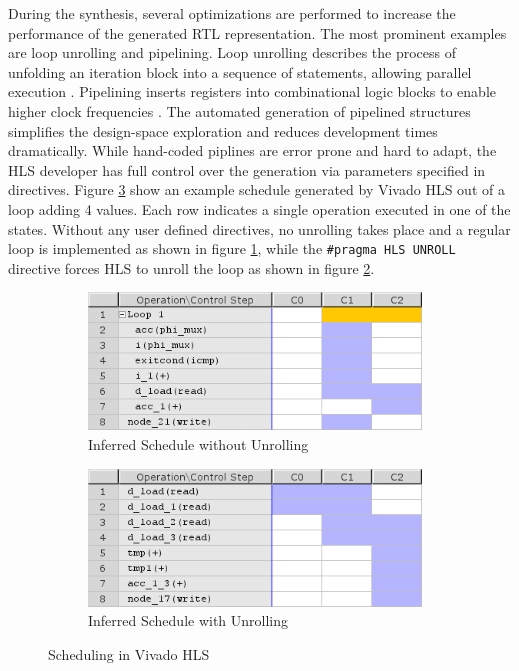 During the synthesis, several optimizations are performed to increase the
performance of the generated \ac{RTL} representation. The most prominent
examples are loop unrolling and pipelining. Loop unrolling describes the
process of unfolding an iteration block into a sequence of statements,
allowing parallel execution \citep{SWL13}. Pipelining inserts registers into
combinational logic blocks to enable higher clock frequencies \citep{SWL13}.
The automated generation of pipelined structures simplifies the design-space
exploration and reduces development times dramatically. While hand-coded
piplines are error prone and hard to adapt, the \ac{HLS} developer has full
control over the generation via parameters specified in directives. Figure
\ref{fig:hls} show an example schedule generated by Vivado HLS out of a loop
adding 4 values. Each row indicates a single operation executed in one of the
states. Without any user defined directives, no unrolling takes place and a
regular loop is implemented as shown in figure \ref{fig:hls_n}, while the
\lstinline{#pragma HLS UNROLL} directive forces \ac{HLS} to unroll the loop as
shown in figure
\ref{fig:hls_u}.
%
%
%
\begin{figure}[tb]
	\centering
	\begin{subfigure}{0.49\textwidth}
		\centering
		\includegraphics[width=0.97\textwidth]{../figures/hls_n}
		\caption{Inferred Schedule without Unrolling}
		\label{fig:hls_n}
	\end{subfigure}
	\begin{subfigure}{0.49\textwidth}
		\centering
		\includegraphics[width=0.97\textwidth]{../figures/hls_u}
		\caption{Inferred Schedule with Unrolling}
		\label{fig:hls_u}
	\end{subfigure}
	\caption{Scheduling in Vivado HLS}
	\label{fig:hls}
\end{figure}

